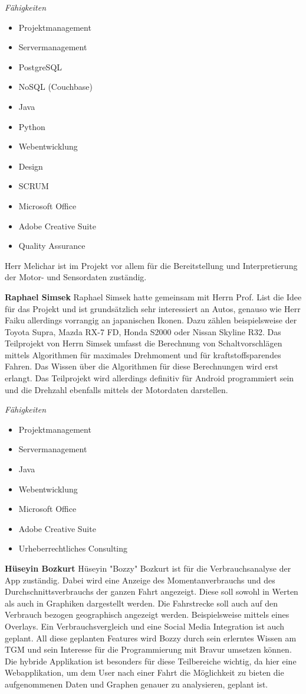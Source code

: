 \textit{Fähigkeiten}
\begin{itemize}
	\item Projektmanagement
	\item Servermanagement				
	\item PostgreSQL
	\item NoSQL (Couchbase)
	\item Java
	\item Python
	\item Webentwicklung
	\item Design
	\item SCRUM
	\item Microsoft Office
	\item Adobe Creative Suite
	\item Quality Assurance
\end{itemize}
Herr Melichar ist im Projekt vor allem für die Bereitstellung und Interpretierung der Motor- und Sensordaten zuständig. 

\newpage

\textbf{Raphael Simsek}
Raphael Simsek hatte gemeinsam mit Herrn Prof. List die Idee für das Projekt und ist grundsätzlich sehr interessiert an Autos, genauso wie Herr Faiku allerdings vorrangig an japanischen Ikonen. Dazu zählen beispielsweise der Toyota Supra, Mazda RX-7 FD, Honda S2000 oder Nissan Skyline R32. Das Teilprojekt von Herrn Simsek umfasst die Berechnung von Schaltvorschlägen mittels Algorithmen für maximales Drehmoment und für kraftstoffsparendes Fahren. Das Wissen über die Algorithmen für diese Berechnungen wird erst erlangt. Das Teilprojekt wird allerdings definitiv für Android programmiert sein und die Drehzahl ebenfalls mittels der Motordaten darstellen.

\textit{Fähigkeiten}
\begin{itemize}
	\item Projektmanagement
	\item Servermanagement				
	\item Java
	\item Webentwicklung
	\item Microsoft Office
	\item Adobe Creative Suite
	\item Urheberrechtliches Consulting
\end{itemize}

\textbf{Hüseyin Bozkurt}
Hüseyin "Bozzy" Bozkurt ist für die Verbrauchsanalyse der App zuständig. Dabei wird eine Anzeige des Momentanverbrauchs und des Durchschnittsverbrauchs der ganzen Fahrt angezeigt. Diese soll sowohl in Werten als auch in Graphiken dargestellt werden. Die Fahrstrecke soll auch auf den Verbrauch bezogen geographisch angezeigt werden. Beispielsweise mittels eines Overlays. Ein Verbrauchsvergleich und eine Social Media Integration ist auch geplant.
All diese geplanten Features wird Bozzy durch sein erlerntes Wissen am TGM und sein Interesse für die Programmierung mit Bravur umsetzen können. Die hybride Applikation ist besonders für diese Teilbereiche wichtig, da hier eine Webapplikation, um dem User nach einer Fahrt die Möglichkeit zu bieten die aufgenommenen Daten und Graphen genauer zu analysieren, geplant ist.

